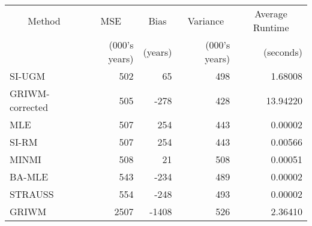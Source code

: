 
\begin{tabular}{lrrrr}
\toprule
\multicolumn{1}{c}{Method} & \multicolumn{1}{c}{MSE} & \multicolumn{1}{c}{Bias} & \multicolumn{1}{c}{Variance} & \multicolumn{1}{c}{Average Runtime} \\
\cmidrule(l{3pt}r{3pt}){1-1} \cmidrule(l{3pt}r{3pt}){2-2} \cmidrule(l{3pt}r{3pt}){3-3} \cmidrule(l{3pt}r{3pt}){4-4} \cmidrule(l{3pt}r{3pt}){5-5}
 & (000's years) & (years) & (000's years) & (seconds)\\
\midrule
SI-UGM & 502 & 65 & 498 & 1.68008\\
GRIWM-corrected & 505 & -278 & 428 & 13.94220\\
MLE & 507 & 254 & 443 & 0.00002\\
SI-RM & 507 & 254 & 443 & 0.00566\\
MINMI & 508 & 21 & 508 & 0.00051\\
\addlinespace
BA-MLE & 543 & -234 & 489 & 0.00002\\
STRAUSS & 554 & -248 & 493 & 0.00002\\
GRIWM & 2507 & -1408 & 526 & 2.36410\\
\bottomrule
\end{tabular}
